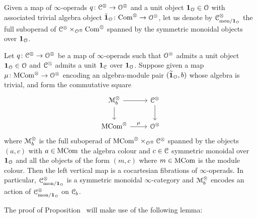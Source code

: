 Given a map of $\infty$-operads $q\colon \mathcal C^{\otimes} \to \mathcal{O}^{\otimes}$ and a unit object $\mathbf{1}_{\mathcal{O}} \in \mathcal{O}$ with associated trivial algebra object $\tilde{\mathbf{1}}_{\mathcal{O}}\colon \mathrm{Com}^{\otimes} \to \mathcal{O}^{\otimes}$, let us denote by $\mathcal C^\otimes_{\mathrm{mon}/\mathbf{1}_{\mathcal{O}}}$ the full suboperad of $\mathcal C^{\otimes} \times_{\mathcal{O}^{\otimes}} \mathrm{Com}^{\otimes}$ spanned by the symmetric monoidal objects over $\mathbf{1}_{\mathcal{O}}$.


\begin{proposition}
\label{proposition:main-point}%
Let $q\colon \mathcal C^{\otimes} \to \mathcal{O}^{\otimes}$ be a map of $\infty$-operads such that $\mathcal{O}^{\otimes}$ admits a unit object $\mathbf{1}_{\mathcal{O}}\in \mathcal{O}$ and $\mathcal C^{\otimes}$ admits a unit $\mathbf{1}_{\mathcal C}$ over $\mathbf{1}_{\mathcal{O}}$. 
Suppose given a map $\mu\colon \mathrm{MCom}^{\otimes} \to \mathcal{O}^{\otimes}$ encoding an algebra-module pair $(\widetilde{\mathbf{1}}_{\mathcal{O}},b)$ whose algebra is trivial, and form the commutative square
\[
\begin{tikzcd}
\M_b^{\otimes} \ar[r]\ar[d] & \C^{\otimes} \ar[d] \\
\MCom^{\otimes} \ar[r,"\mu"] & \cO^{\otimes}
\end{tikzcd}
\]
where $\mathcal{M}_b^{\otimes}$ is the full suboperad of $\mathrm{MCom}^{\otimes}\times_{\mathcal{O}^{\otimes}} \mathcal C^{\otimes}$ spanned by the objects $(a, c)$ with $a \in \mathrm{MCom}$ the algebra colour and $c \in \mathcal C$ symmetric monoidal over $\mathbf{1}_{\mathcal{O}}$ and all the objects of the form $(m,c)$ where $m \in \mathrm{MCom}$ is the module colour.
Then the left vertical map is a cocartesian fibrations of $\infty$-operads. In particular, $\mathcal C^{\otimes}_{\mathrm{mon}/\mathbf{1}_{\mathcal{O}}}$ is a symmetric monoidal $\infty$-category and $\mathcal{M}_b^{\otimes}$ encodes an action of $\mathcal C^{\otimes}_{\mathrm{mon}/\mathbf{1}_{\mathcal{O}}}$ on $\mathcal C_b$.
\end{proposition}

The proof of Proposition~ will make use of the following lemma:

